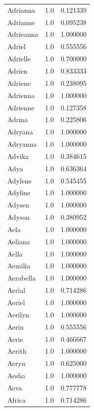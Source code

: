 \documentclass[
  letterpaper,
  DIV=11,
  numbers=noendperiod]{scrreprt}
\begin{document}
\begin{tabular}{lrr}
Adrianna        &   1.0 &   0.121339 \\
Adrianne        &   1.0 &   0.095238 \\
Adrieanna       &   1.0 &   1.000000 \\
Adriel          &   1.0 &   0.555556 \\
Adrielle        &   1.0 &   0.700000 \\
Adrien          &   1.0 &   0.833333 \\
Adriene         &   1.0 &   0.238095 \\
Adrienna        &   1.0 &   1.000000 \\
Adrienne        &   1.0 &   0.127358 \\
Adrina          &   1.0 &   0.225806 \\
Adryana         &   1.0 &   1.000000 \\
Adryanna        &   1.0 &   1.000000 \\
Advika          &   1.0 &   0.384615 \\
Adya            &   1.0 &   0.636364 \\
Adylene         &   1.0 &   0.545455 \\
Adyline         &   1.0 &   1.000000 \\
Adysen          &   1.0 &   1.000000 \\
Adyson          &   1.0 &   0.380952 \\
Aela            &   1.0 &   1.000000 \\
Aeliana         &   1.0 &   1.000000 \\
Aella           &   1.0 &   1.000000 \\
Aemilia         &   1.0 &   1.000000 \\
Aerabella       &   1.0 &   1.000000 \\
Aerial          &   1.0 &   0.714286 \\
Aeriel          &   1.0 &   1.000000 \\
Aerilyn         &   1.0 &   1.000000 \\
Aerin           &   1.0 &   0.555556 \\
Aeris           &   1.0 &   0.466667 \\
Aerith          &   1.0 &   1.000000 \\
Aeryn           &   1.0 &   0.625000 \\
Aesha           &   1.0 &   1.000000 \\
Aeva            &   1.0 &   0.777778 \\
Africa          &   1.0 &   0.714286 \\

\end{tabular}
\end{document}
